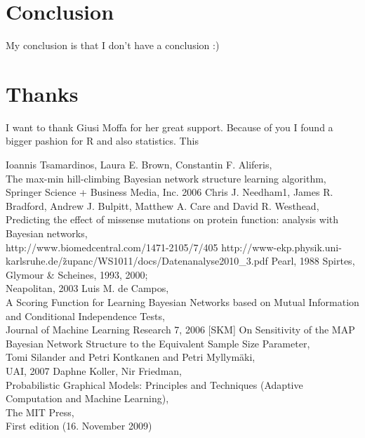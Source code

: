 
\chapter{Conclusion}

	My conclusion is that I don't have a conclusion :)

\chapter{Thanks}

	I want to thank Giusi Moffa for her great support. Because of you I found a bigger pashion for R and also statistics. This 


\begin{thebibliography}{56}

Ioannis Tsamardinos, Laura E. Brown, Constantin F. Aliferis,\\
The max-min hill-climbing Bayesian network structure learning algorithm,\\
Springer Science + Business Media,
Inc. 2006
Chris J. Needham1, James R. Bradford, Andrew J. Bulpitt, Matthew A. Care and David R. Westhead,\\
Predicting the effect of missense mutations on protein function: analysis with Bayesian networks,\\
http://www.biomedcentral.com/1471-2105/7/405
http://www-ekp.physik.uni-karlsruhe.de/\~zupanc/WS1011/docs/Datenanalyse2010\_3.pdf
Pearl,
1988
Spirtes, Glymour \& Scheines,
1993, 2000; \\
Neapolitan,
2003
Luis M. de Campos,\\
A Scoring Function for Learning Bayesian Networks based on Mutual
Information and Conditional Independence Tests,\\
Journal of Machine Learning Research 7, 2006
[SKM]
On Sensitivity of the MAP Bayesian Network Structure to the Equivalent Sample Size Parameter,\\
Tomi Silander and Petri Kontkanen and Petri Myllymäki,\\
UAI, 2007
Daphne Koller, Nir Friedman,\\
Probabilistic Graphical Models: Principles and Techniques (Adaptive Computation and Machine Learning),\\
The MIT Press,\\
First edition (16. November 2009)

\end{thebibliography}




